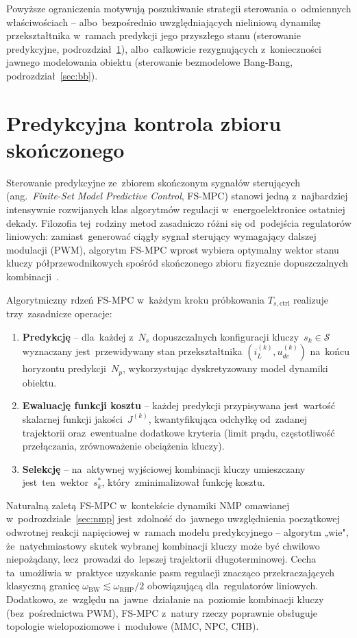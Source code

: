Powyższe ograniczenia motywują poszukiwanie strategii sterowania o~odmiennych właściwościach -- albo~bezpośrednio uwzględniających nieliniową dynamikę przekształtnika w~ramach predykcji jego przyszłego stanu (sterowanie predykcyjne, podrozdział~\ref{sec:fsmpc}), albo~całkowicie rezygnujących z~konieczności jawnego modelowania obiektu (sterowanie bezmodelowe Bang-Bang, podrozdział~\ref{sec:bb}).

\section{Predykcyjna kontrola zbioru skończonego}
\label{sec:fsmpc}

Sterowanie predykcyjne ze~zbiorem skończonym sygnałów sterujących (ang.~\emph{Finite-Set Model Predictive Control}, FS-MPC) stanowi jedną z~najbardziej intensywnie rozwijanych klas algorytmów regulacji w~energoelektronice ostatniej dekady. Filozofia tej~rodziny metod zasadniczo różni się od~podejścia regulatorów liniowych: zamiast~generować ciągły sygnał sterujący wymagający dalszej modulacji (PWM), algorytm FS-MPC wprost wybiera optymalny wektor stanu kluczy półprzewodnikowych spośród skończonego zbioru fizycznie dopuszczalnych kombinacji~\cite{tatari2025splitcost}.

Algorytmiczny rdzeń FS-MPC w~każdym kroku próbkowania $T_{s,\mathrm{ctrl}}$ realizuje trzy~zasadnicze operacje:
\begin{enumerate}
    \item \textbf{Predykcję} -- dla~każdej z~$N_s$ dopuszczalnych konfiguracji kluczy~$s_k \in \mathcal{S}$ wyznaczany jest~przewidywany stan przekształtnika $(i_L^{(k)}, u_{dc}^{(k)})$ na~końcu horyzontu predykcji~$N_p$, wykorzystując dyskretyzowany model dynamiki obiektu.
    \item \textbf{Ewaluację funkcji kosztu} -- każdej predykcji przypisywana jest~wartość skalarnej funkcji jakości~$J^{(k)}$, kwantyfikująca odchyłkę od~zadanej trajektorii oraz~ewentualne dodatkowe kryteria (limit prądu, częstotliwość przełączania, zrównoważenie obciążenia kluczy).
    \item \textbf{Selekcję} -- na~aktywnej wyjściowej kombinacji kluczy umieszczany jest~ten~wektor~$s_k^{*}$, który~zminimalizował funkcję kosztu.
\end{enumerate}

Naturalną zaletą FS-MPC w~kontekście dynamiki NMP omawianej w~podrozdziale~\ref{sec:nmp} jest~zdolność do~jawnego uwzględnienia początkowej odwrotnej reakcji napięciowej w~ramach modelu predykcyjnego -- algorytm „wie", że~natychmiastowy skutek wybranej kombinacji kluczy może być chwilowo niepożądany, lecz~prowadzi do~lepszej trajektorii długoterminowej. Cecha ta~umożliwia w~praktyce uzyskanie pasm regulacji znacząco przekraczających klasyczną granicę $\omega_{\mathrm{BW}} \lesssim \omega_{\mathrm{RHP}}/2$ obowiązującą dla~regulatorów liniowych. Dodatkowo, ze~względu na~jawne~działanie na~poziomie kombinacji kluczy (bez~pośrednictwa PWM), FS-MPC z~natury rzeczy poprawnie obsługuje topologie wielopoziomowe i~modułowe (MMC, NPC, CHB).

